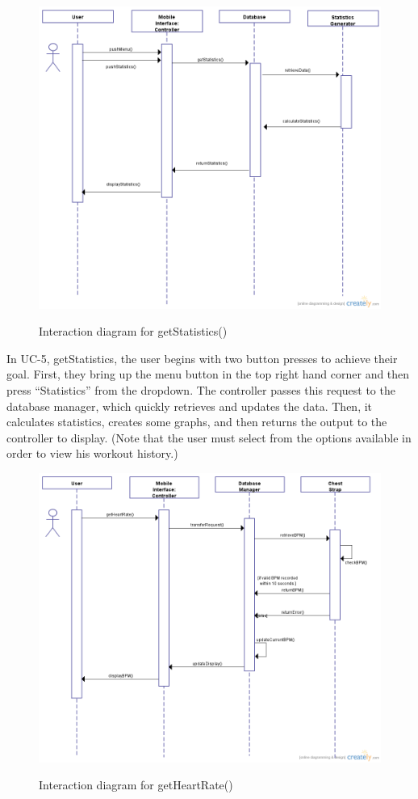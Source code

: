 \documentclass[letterpaper,english, 12pt]{scrreprt}
\begin{document}
\begin{figure}[H]
	\includegraphics[scale=.40]{img/Interaction_Diagrams/newUC5.png}\\
	\caption {Interaction diagram for getStatistics()} 
\end{figure}
In UC-5, getStatistics, the user begins with two button presses to achieve their goal. First, they bring up the menu button in the top right hand corner and then press ``Statistics'' from the dropdown. The controller passes this request to the database manager, which quickly retrieves and updates the data. Then, it calculates statistics, creates some graphs, and then returns the output to the controller to display. (Note that the user must select from the options available in order to view his workout history.)

\begin{figure}[H]
	\includegraphics[scale=.40]{img/Interaction_Diagrams/newUC6.png}\\
	\caption {Interaction diagram for getHeartRate()} 
\end{figure}
\end{document}
